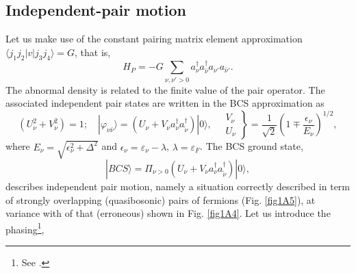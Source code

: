 \subsection{Independent-pair motion}\label{C1AppDS2}
Let us make use of the constant pairing matrix element approximation $\langle j_1j_2|v|j_3j_4\rangle=G$, that is, 
\begin{equation}
H_P=-G\sum_{\nu, \nu'>0}a^{\dagger}_\nu a^{\dagger}_{\bar\nu}a_{\nu'} a_{\bar\nu'}.
\end{equation}
 The abnormal density is related to the finite value of the pair operator. The associated independent pair states are written in the BCS approximation as
\begin{equation}
\left(U_\nu^2+V_\nu^2\right)=1;\quad |\varphi_{\nu\bar\nu}\rangle=\left(U_\nu+V_\nu  a^\dagger_{\nu}a^\dagger_{\tilde{\nu}}\right)|0\rangle,\quad\left.\begin{array}{c}
V_\nu \\ 
U_\nu
\end{array}\right\}=\frac{1}{\sqrt{2}}\left(1\mp\frac{\epsilon_\nu}{E_\nu}\right)^{1/2},
\end{equation}
where $E_\nu=\sqrt{\epsilon_\nu^2+\Delta^2}$ and $\epsilon_\nu=\varepsilon_\nu-\lambda$, $\lambda=\varepsilon_F$.
The BCS ground state,
\begin{equation}
|BCS\rangle=\Pi_{\nu>0}\left(U_\nu+V_\nu a^\dagger_{\nu}a^\dagger_{\tilde{\nu}}\right)|0\rangle,
\end{equation}
describes independent pair motion, namely a situation correctly described in term of strongly overlapping (quasibosonic) pairs of fermions (Fig. \ref{fig1A5}), at variance with of that (erroneous) shown in Fig. \ref{fig1A4}.
Let us introduce the phasing\footnote{See \cite{Schrieffer:73}.}, 

